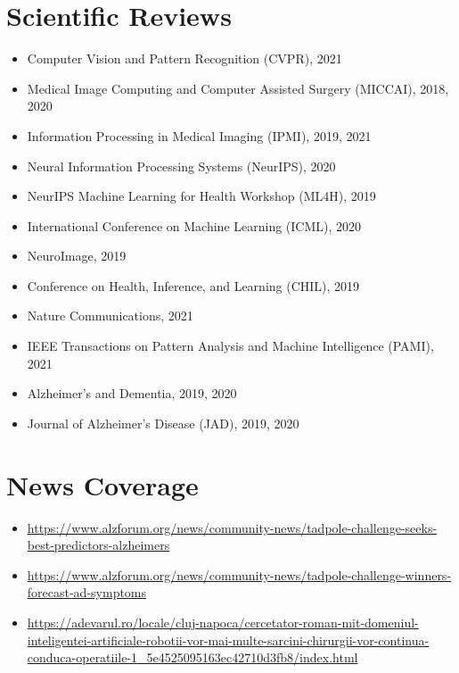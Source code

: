 \documentclass[a4paper,10pt]{article} %
\begin{document}
\section*{Scientific Reviews}
\begin{itemize}
 \item Computer Vision and Pattern Recognition (CVPR), 2021
 \item Medical Image Computing and Computer Assisted Surgery (MICCAI), 2018, 2020
 \item Information Processing in Medical Imaging (IPMI), 2019, 2021
 \item Neural Information Processing Systems (NeurIPS), 2020
 \item NeurIPS Machine Learning for Health Workshop (ML4H), 2019
 \item International Conference on Machine Learning (ICML), 2020
 \item NeuroImage, 2019
 \item Conference on Health, Inference, and Learning (CHIL), 2019
 \item Nature Communications, 2021
 \item IEEE Transactions on Pattern Analysis and Machine Intelligence (PAMI), 2021
 \item Alzheimer's and Dementia, 2019, 2020
 \item Journal of Alzheimer's Disease (JAD), 2019, 2020
\end{itemize}


\section*{News Coverage}
\begin{itemize}
 \item \url{https://www.alzforum.org/news/community-news/tadpole-challenge-seeks-best-predictors-alzheimers}
 \item \url{https://www.alzforum.org/news/community-news/tadpole-challenge-winners-forecast-ad-symptoms}
 \item \url{https://adevarul.ro/locale/cluj-napoca/cercetator-roman-mit-domeniul-inteligentei-artificiale-robotii-vor-mai-multe-sarcini-chirurgii-vor-continua-conduca-operatiile-1_5e4525095163ec42710d3fb8/index.html}
\end{itemize}
\end{document}
